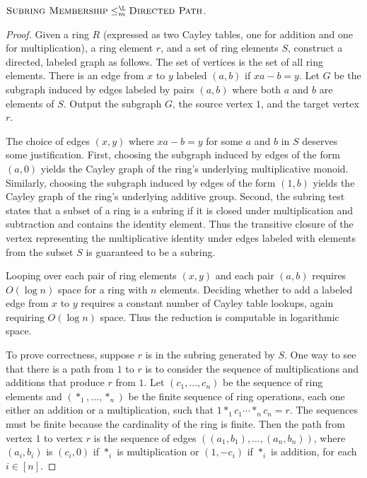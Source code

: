 \documentclass{article}
\begin{document}
\begin{lemma}\label{lem:memtopath}
  $\textsc{Subring Membership} \leq_m^{\L} \textsc{Directed Path}$.
\end{lemma}
\begin{proof}
  Given a ring $R$ (expressed as two Cayley tables, one for addition and one for multiplication), a ring element $r$, and a set of ring elements $S$, construct a directed, labeled graph as follows.
  The set of vertices is the set of all ring elements.
  There is an edge from $x$ to $y$ labeled $(a, b)$ if $x a - b = y$.
  Let $G$ be the subgraph induced by edges labeled by pairs $(a, b)$ where both $a$ and $b$ are elements of $S$.
  Output the subgraph $G$, the source vertex $1$, and the target vertex $r$.

  The choice of edges $(x, y)$ where $x a - b = y$ for some $a$ and $b$ in $S$ deserves some justification.
  First, choosing the subgraph induced by edges of the form $(a, 0)$ yields the Cayley graph of the ring's underlying multiplicative monoid.
  Similarly, choosing the subgraph induced by edges of the form $(1, b)$ yields the Cayley graph of the ring's underlying additive group.
  Second, the subring test states that a subset of a ring is a subring if it is closed under multiplication and subtraction and contains the identity element.
  Thus the transitive closure of the vertex representing the multiplicative identity under edges labeled with elements from the subset $S$ is guaranteed to be a subring.

  Looping over each pair of ring elements $(x, y)$ and each pair $(a, b)$ requires $O(\log n)$ space for a ring with $n$ elements.
  Deciding whether to add a labeled edge from $x$ to $y$ requires a constant number of Cayley table lookups, again requiring $O(\log n)$ space.
  Thus the reduction is computable in logarithmic space.

  To prove correctness, suppose $r$ is in the subring generated by $S$.
  One way to see that there is a path from $1$ to $r$ is to consider the sequence of multiplications and additions that produce $r$ from $1$.
  Let $(c_1, \dotsc, c_n)$ be the sequence of ring elements and $(\ast_1, \dotsc, \ast_n)$ be the finite sequence of ring operations, each one either an addition or a multiplication, such that $1 \ast_1 c_1 \dotsb \ast_n c_n = r$.
  The sequences must be finite because the cardinality of the ring is finite.
  Then the path from vertex $1$ to vertex $r$ is the sequence of edges $((a_1, b_1), \dotsc, (a_n, b_n))$, where $(a_i, b_i)$ is $(c_i, 0)$ if $\ast_i$ is multiplication or $(1, -c_i)$ if $\ast_i$ is addition, for each $i \in [n]$.


\end{proof}
\end{document}
